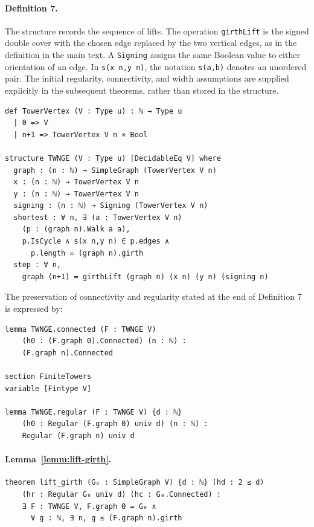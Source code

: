 \par\medskip
\noindent\begin{minipage}{\linewidth}
\paragraph*{Definition 7.}
The structure records the sequence of lifts. The operation
\lstinline|girthLift| is the signed double cover with the chosen edge
replaced by the two vertical edges, as in the definition in the main
text. A \lstinline|Signing| assigns the same Boolean value to either
orientation of an edge. In \lstinline|s(x n,y n)|, the notation
\lstinline|s(a,b)| denotes an unordered pair.
The initial regularity, connectivity, and width assumptions are supplied
explicitly in the subsequent theorems, rather than stored in the structure.
\begin{lstlisting}
def TowerVertex (V : Type u) : ℕ → Type u
  | 0 => V
  | n+1 => TowerVertex V n × Bool

structure TWNGE (V : Type u) [DecidableEq V] where
  graph : (n : ℕ) → SimpleGraph (TowerVertex V n)
  x : (n : ℕ) → TowerVertex V n
  y : (n : ℕ) → TowerVertex V n
  signing : (n : ℕ) → Signing (TowerVertex V n)
  shortest : ∀ n, ∃ (a : TowerVertex V n)
    (p : (graph n).Walk a a),
    p.IsCycle ∧ s(x n,y n) ∈ p.edges ∧
      p.length = (graph n).girth
  step : ∀ n,
    graph (n+1) = girthLift (graph n) (x n) (y n) (signing n)
\end{lstlisting}
The preservation of connectivity and regularity stated at the end of
Definition 7 is expressed by:
\begin{lstlisting}
lemma TWNGE.connected (F : TWNGE V)
    (h0 : (F.graph 0).Connected) (n : ℕ) :
    (F.graph n).Connected

section FiniteTowers
variable [Fintype V]

lemma TWNGE.regular (F : TWNGE V) {d : ℕ}
    (h0 : Regular (F.graph 0) univ d) (n : ℕ) :
    Regular (F.graph n) univ d
\end{lstlisting}
\end{minipage}
\par\medskip
\noindent\begin{minipage}{\linewidth}
\paragraph*{Lemma~\ref{lemm:lift-girth}.}
\begin{lstlisting}
theorem lift_girth (G₀ : SimpleGraph V) {d : ℕ} (hd : 2 ≤ d)
    (hr : Regular G₀ univ d) (hc : G₀.Connected) :
    ∃ F : TWNGE V, F.graph 0 = G₀ ∧
      ∀ g : ℕ, ∃ n, g ≤ (F.graph n).girth
\end{lstlisting}
\end{minipage}

